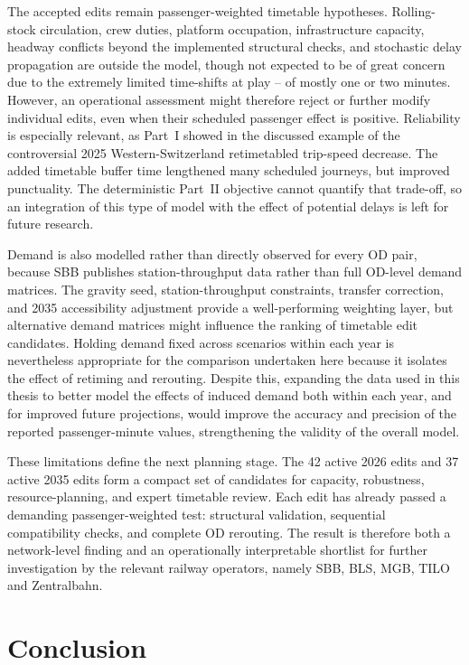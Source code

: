 \documentclass[preprint,12pt]{elsarticle}
\begin{document}
The accepted edits remain passenger-weighted timetable hypotheses. Rolling-stock circulation, crew duties, platform occupation, infrastructure capacity, headway conflicts beyond the implemented structural checks, and stochastic delay propagation are outside the model, though not expected to be of great concern due to the extremely limited time-shifts at play -- of mostly one or two minutes. However, an operational assessment might therefore reject or further modify individual edits, even when their scheduled passenger effect is positive. Reliability is especially relevant, as Part~I showed in the discussed example of the controversial 2025 Western-Switzerland retimetabled trip-speed decrease. The added timetable buffer time lengthened many scheduled journeys, but improved punctuality. The deterministic Part~II objective cannot quantify that trade-off, so an integration of this type of model with the effect of potential delays is left for future research.

Demand is also modelled rather than directly observed for every OD pair, because SBB publishes station-throughput data rather than full OD-level demand matrices. The gravity seed, station-throughput constraints, transfer correction, and 2035 accessibility adjustment provide a well-performing weighting layer, but alternative demand matrices might influence the ranking of timetable edit candidates. Holding demand fixed across scenarios within each year is nevertheless appropriate for the comparison undertaken here because it isolates the effect of retiming and rerouting. Despite this, expanding the data used in this thesis to better model the effects of induced demand both within each year, and for improved future projections, would improve the accuracy and precision of the reported passenger-minute values, strengthening the validity of the overall model.

These limitations define the next planning stage. The 42 active 2026 edits and 37 active 2035 edits form a compact set of candidates for capacity, robustness, resource-planning, and expert timetable review. Each edit has already passed a demanding passenger-weighted test: structural validation, sequential compatibility checks, and complete OD rerouting. The result is therefore both a network-level finding and an operationally interpretable shortlist for further investigation by the relevant railway operators, namely SBB, BLS, MGB, TILO and Zentralbahn.

\clearpage
\section{Conclusion}\label{sec:conclusion}
\end{document}
